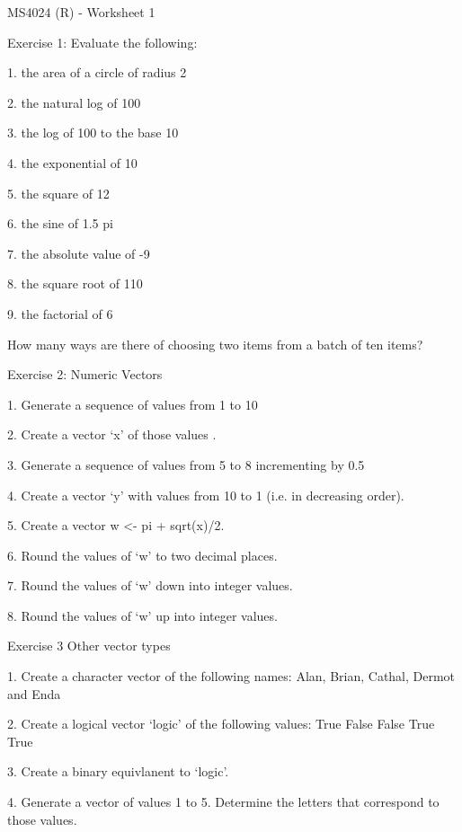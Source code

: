 

MS4024 (R) - Worksheet 1

 

 Exercise 1: Evaluate the following:

 
1.
the area of a circle of radius 2             

2.
the natural log of  100                           

3.
the log of 100 to the base 10   

4.
the exponential of 10                           

5.
the square of 12                                         

6.
the sine of 1.5 pi                           

7.
the absolute value of  -9             

8.
the square root of 110             

9.
the factorial of 6


 

How many ways are there of choosing two items from a batch of ten items?

 

Exercise 2: Numeric Vectors

 

1.      Generate a sequence of values from 1 to 10

2.      Create a vector ‘x’ of those values .

3.      Generate a sequence of values from 5 to 8 incrementing by 0.5

4.      Create a vector ‘y’ with values from 10 to 1 (i.e. in decreasing order).

5.      Create a vector w <- pi + sqrt(x)/2.

6.      Round the values of ‘w’ to two decimal places.

7.      Round the values of ‘w’ down into integer values.

8.      Round the values of ‘w’ up into integer values.

 

Exercise 3 Other vector types

 
1.
Create a character vector of the following names: Alan, Brian, Cathal, Dermot and Enda

2.
Create a logical vector ‘logic’ of the following values: True False False True True

3.
Create a binary equivlanent to ‘logic’.

4.
Generate a vector of values 1 to 5.  Determine the letters that correspond to those values.

